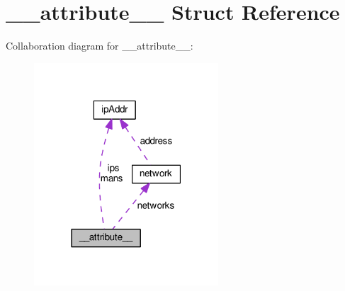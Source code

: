 \hypertarget{struct____attribute____}{}\section{\+\_\+\+\_\+attribute\+\_\+\+\_\+ Struct Reference}
\label{struct____attribute____}


Collaboration diagram for \+\_\+\+\_\+attribute\+\_\+\+\_\+\+:
\nopagebreak
\begin{figure}[H]
\begin{center}
\leavevmode
\includegraphics[width=195pt]{dd/d0e/struct____attribute______coll__graph}
\end{center}
\end{figure}
